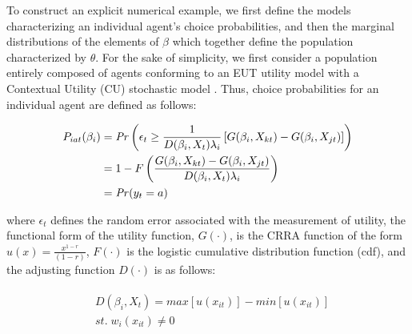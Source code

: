 \documentclass[../main.tex]{subfiles}
\begin{document}
To construct an explicit numerical example, we first define the models characterizing an individual agent's choice probabilities, and then the marginal distributions of the elements of $\beta$ which together define the population characterized by $\theta$.
For the sake of simplicity, we first consider a population entirely composed of agents conforming to an EUT utility model with a Contextual Utility (CU) stochastic model \parencite{Wilcox2008}.
Thus, choice probabilities for an individual agent are defined as follows:

\addtocounter{footnote}{-1}

\begin{align}
	\label{eq3:RE}
	\begin{split}
	P_{iat}(\beta_i) &= {\mathit{Pr}}\left(  \epsilon_t \geq \frac{1}{D(\beta_i,X_t) \lambda_i} \left[ G(\beta_i,X_{kt}) - G(\beta_i,X_{jt}) \right] \right)\\
	&= 1 - F\left( \dfrac{G(\beta_i,X_{kt}) - G(\beta_i,X_{jt})}{D(\beta_i,X_t)\lambda_i }  \right)\\
	&= {\mathit{Pr}}(y_t = a)
	\end{split}
\end{align}

\noindent where $\epsilon_t$ defines the random error associated with the measurement of utility, the functional form of the utility function, $G(\cdot)$, is the CRRA function of the form $u(x) = \frac{x^{1-r}}{(1-r)}$, $F(\cdot)$ is the logistic cumulative distribution function (cdf), and the adjusting function $D(\cdot)$ is as follows:

\begin{align}
	\label{eq3:CU}
	\begin{split}
		&D(\beta_i,X_t) = \mathit{max}[u(x_{it})] - \mathit{min}[u(x_{it})]\\
		&\mathit{st.}\; w_i(x_{it}) \neq 0
	\end{split}
\end{align}
\end{document}
